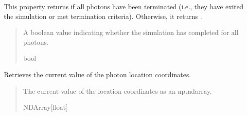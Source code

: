 \documentclass[letterpaper,10pt,english]{sphinxmanual}
\begin{document}
\begin{fulllineitems}
\begin{fulllineitems}
\sphinxAtStartPar
This property returns  if all photons have been terminated (i.e., they have exited the simulation
or met termination criteria). Otherwise, it returns .
\begin{quote}\begin{description}
\sphinxAtStartPar
A boolean value indicating whether the simulation has completed for all photons.

\sphinxAtStartPar
bool

\end{description}\end{quote}

\end{fulllineitems}


\begin{fulllineitems}
\label{\detokenize{generated/photon_canon.optics:photon_canon.optics.Photon.location_coordinates}}
\pysigstartsignatures
\pysigline
{}
\pysigstopsignatures
\sphinxAtStartPar
Retrieves the current value of the photon location coordinates.
\begin{quote}\begin{description}
\sphinxAtStartPar
The current value of the location coordinates as an np.ndarray.

\sphinxAtStartPar
NDArray{[}float{]}

\end{description}\end{quote}

\end{fulllineitems}



\end{fulllineitems}
\end{document}
